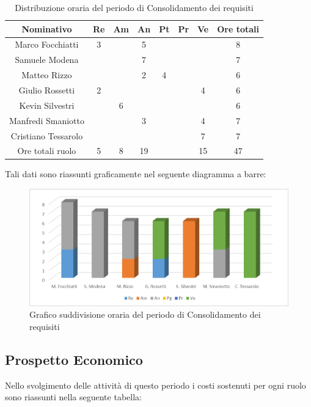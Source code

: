 \documentclass[./PianodiProgetto.tex]{subfiles}
\begin{document}
\begin{table}[H]
	\centering
	\begin{tabular}{|c|cccccc|c|}
		\hline
		Nominativo&Re&Am&An&Pt&Pr&Ve&Ore totali\\ \hline
		Marco Focchiatti&3& &5& & & &8 \\ \hline
		Samuele Modena& & &7& & & &7 \\ \hline
		Matteo Rizzo& & &2&4& & &6 \\ \hline
		Giulio Rossetti&2& & & & &4&6 \\ \hline
		Kevin Silvestri& &6& & & & &6 \\ \hline
		Manfredi Smaniotto& & &3& & &4&7 \\ \hline
		Cristiano Tessarolo& & & & & &7&7 \\  \hline
		Ore totali ruolo&5&8&19& & &15&47 \\ \hline
	\end{tabular}
	\caption{Distribuzione oraria del periodo di Consolidamento dei requisiti}
\end{table}

Tali dati sono riassunti graficamente nel seguente diagramma a barre:
\begin{figure}[H]
	\centering
	\includegraphics[width=1\linewidth]{img/grafici/ConsolidamentoRequisitiProspettoOrario}
	\caption{Grafico suddivisione oraria del periodo di Consolidamento dei requisiti}
	\label{fig:consolidamento-requisiti-prospetto-orario}
\end{figure}

\subsection{Prospetto Economico}
Nello svolgimento delle attività di questo periodo i costi sostenuti per ogni ruolo sono riassunti nella seguente tabella:
\end{document}
